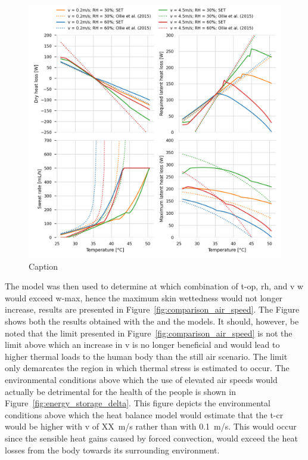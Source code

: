 \begin{figure}
    \centering
    \includegraphics[width=\textwidth]{figures/comparison_models_v2.png}
    \caption{Caption}
    \label{fig:comparison_models}
\end{figure}

The  model was then used to determine at which combination of \ac{t-op}, \ac{rh}, and \ac{v} \ac{w} would exceed \ac{w-max}, hence the maximum skin wettedness would not longer increase, results are presented in Figure~\ref{fig:comparison_air_speed}.
The Figure shows both the results obtained with the and the  models.
It should, however, be noted that the limit presented in Figure~\ref{fig:comparison_air_speed} is not the limit above which an increase in \ac{v} is no longer beneficial and would lead to higher thermal loads to the human body than the still air scenario.
The limit only demarcates the region in which thermal stress is estimated to occur.
The environmental conditions above which the use of elevated air speeds would actually be detrimental for the health of the people is shown in Figure~\ref{fig:energy_storage_delta}.
This figure depicts the environmental conditions above which the heat balance model would estimate that the \ac{t-cr} would be higher with \ac{v} of XX~m/s rather than with 0.1~m/s.
This would occur since the sensible heat gains caused by forced convection, would exceed the heat losses from the body towards its surrounding environment.

